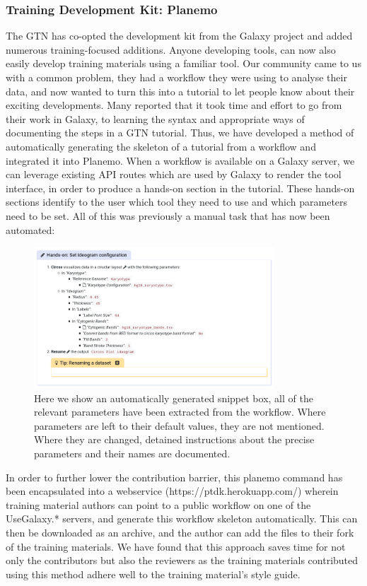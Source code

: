\documentclass[10pt,letterpaper]{article}
\begin{document}
\subsubsection*{Training Development Kit: Planemo}
The GTN has co-opted the development kit from the Galaxy project and added numerous training-focused additions. Anyone developing tools, can now also easily develop training materials using a familiar tool.
Our community came to us with a common problem, they had a workflow they were using to analyse their data, and now wanted to turn this into a tutorial to let people know about their exciting developments.
Many reported that it took time and effort to go from their work in Galaxy, to learning the syntax and appropriate ways of documenting the steps in a GTN tutorial.
Thus, we have developed a method of automatically generating the skeleton of a tutorial from a workflow and integrated it into Planemo.
When a workflow is available on a Galaxy server, we can leverage existing API routes which are used by Galaxy to render the tool interface, in order to produce a hands-on section in the tutorial.
These hands-on sections identify to the user which tool they need to use and which parameters need to be set.
All of this was previously a manual task that has now been automated:

\begin{figure}[!ht]
	\centering
	\includegraphics[width=0.8\textwidth]{images/tool-in-tutorial.png}
	\caption{Here we show an automatically generated snippet box, all of the relevant parameters have been extracted from the workflow. Where parameters are left to their default values, they are not mentioned. Where they are changed, detained instructions about the precise parameters and their names are documented.\label{fig:planemo}}
\end{figure}

In order to further lower the contribution barrier, this planemo command has been encapsulated into a webservice (https://ptdk.herokuapp.com/) wherein training material authors can point to a public workflow on one of the UseGalaxy.* servers, and generate this workflow skeleton automatically. This can then be downloaded as an archive, and the author can add the files to their fork of the training materials.
We have found that this approach saves time for not only the contributors but also the reviewers as the training materials contributed using this method adhere well to the training material’s style guide.
\end{document}
